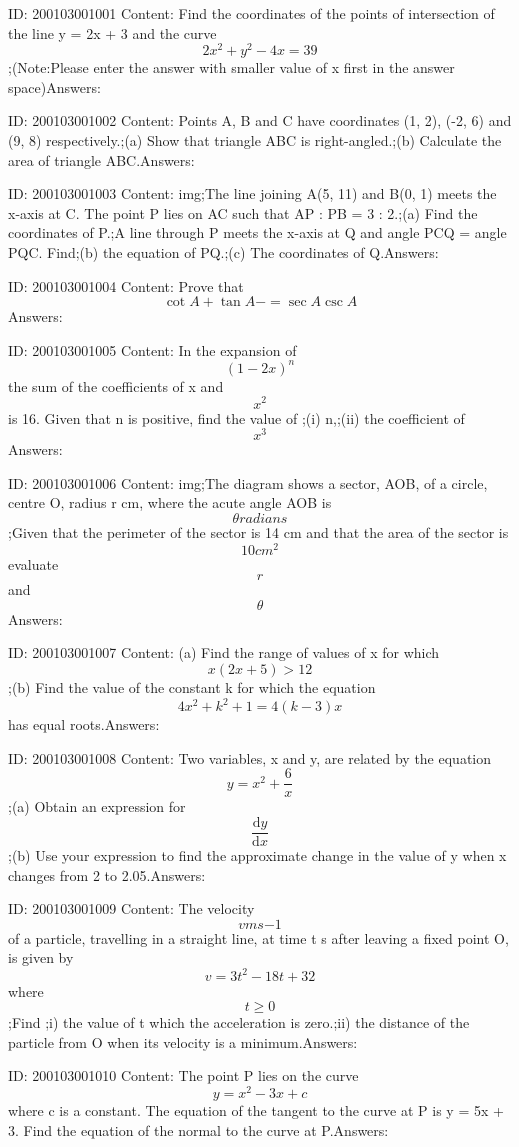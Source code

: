 \documentclass{article}
\begin{document}
ID: 200103001001
Content:
Find the coordinates of the points of intersection of the line y = 2x + 3 and the curve \[2x^2+y^2-4x=39\];(Note:Please enter the answer with smaller value of x first in the answer space)Answers:

ID: 200103001002
Content:
Points A, B and C have coordinates (1, 2), (-2, 6) and (9, 8) respectively.;(a)	Show that triangle ABC is right-angled.;(b)	Calculate the area of triangle ABC.Answers:

ID: 200103001003
Content:
img;The line joining A(5, 11) and B(0, 1) meets the x-axis at C. The point P lies on AC such that AP : PB = 3 : 2.;(a)	Find the coordinates of P.;A line through P meets the x-axis at Q and angle PCQ = angle PQC. Find;(b)	the equation of PQ.;(c)	The coordinates of Q.Answers:

ID: 200103001004
Content:
Prove that  \[\cot A+ \tan A-=\sec A\csc A\]Answers:

ID: 200103001005
Content:
In the expansion of \[(1-2x)^n\] the sum of the coefficients of x and \[x^2\] is 16. Given that n is positive, find the value of ;(i) n,;(ii) the coefficient of \[x^3\]Answers:

ID: 200103001006
Content:
img;The diagram shows a sector, AOB, of a circle, centre O, radius r cm, where the acute angle AOB is \[\theta radians\] ;Given that the perimeter of the sector is 14 cm and that the area of the sector is \[10 cm^2\] evaluate \[r\] and \[\theta\]Answers:

ID: 200103001007
Content:
(a)	Find the range of values of x for which \[x(2x + 5) > 12\];(b)	Find the value of the constant k for which the equation \[4x^2+k^2+1=4(k-3)x\] has equal roots.Answers:

ID: 200103001008
Content:
Two variables, x and y, are related by the equation \[y=x^2+\frac{6}{x}\];(a)	Obtain an expression for \[\frac{\mathrm{d} y}{\mathrm{d} x}\];(b)	Use your expression to find the approximate change in the value of y when x changes from 2 to 2.05.Answers:

ID: 200103001009
Content:
The velocity \[vms{-1}\] of a particle, travelling in a straight line, at time t s after leaving a fixed point O, is given by \[v=3t^2-18t+32\] where \[t\geq 0\];Find ;i) the value of t which the acceleration is zero.;ii) the distance of the particle from O when its velocity is a minimum.Answers:

ID: 200103001010
Content:
The point P lies on the curve \[y=x^2-3x+c\] where c is a constant. The equation of the tangent to the curve at P is y = 5x + 3. Find the equation of the normal to the curve at P.Answers:
\end{document}
